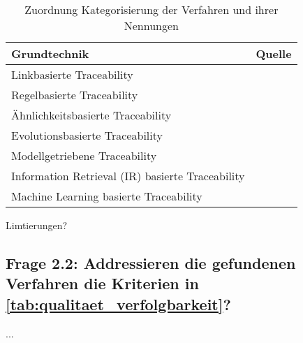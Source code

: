 \begin{table}[htbp]
\renewcommand{\arraystretch}{1.3}
\centering
\begin{threeparttable}
\begin{tabularx}{\columnwidth}{@{}Xl@{}}
\toprule
Grundtechnik & Quelle  \\ \midrule
Linkbasierte Traceability & \cite{Javed2014ACode, Spanoudakis2004Rule-basedRelations, Omoronyia2011ExploringTraceability} \\
Regelbasierte Traceability & \cite{Javed2014ACode, Ghabi2015ExploitingCode, Lago2009AManagement, Mader2012TowardsMaintenance, Mder2007CustomizingProcess, Spanoudakis2004Rule-basedRelations}  \\
Ähnlichkeitsbasierte Traceability & \cite{Tsuchiya2015InteractiveLogs, Omoronyia2011ExploringTraceability, Leuser2010TacklingSpecifications, Spanoudakis2004Rule-basedRelations} \\
Evolutionsbasierte Traceability & \cite{Javed2014ACode, Mader2012TowardsMaintenance} \\
Modellgetriebene Traceability & \cite{Javed2014ACode,Lago2009AManagement, Mader2012TowardsMaintenance, Mder2007CustomizingProcess, Mader2009EnablingRelations, Spanoudakis2004Rule-basedRelations} \\
Information Retrieval (IR) basierte Traceability & \cite{Javed2014ACode, Bavota2014EnhancingInformation, Saputri2016EnsuringApproach, Leuser2010TacklingSpecifications, Merten2016DoData}\\
Machine Learning basierte Traceability & \cite{Javed2014ACode} \\
\bottomrule
\end{tabularx}
\medskip
\end{threeparttable}
\caption{Zuordnung Kategorisierung der Verfahren und ihrer Nennungen}
\label{tab:auswertung_verfahren_kategorisierung}
\end{table}


Limtierungen?



\subsection{Frage 2.2: Addressieren die gefundenen Verfahren die Kriterien in \ref{tab:qualitaet_verfolgbarkeit}?}
...

